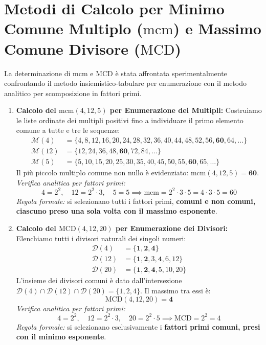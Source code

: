 \documentclass[11pt,a4paper,oneside]{report}
\begin{document}
\section{Metodi di Calcolo per Minimo Comune Multiplo (\texorpdfstring{$\mathrm{mcm}$}{mcm}) e Massimo Comune Divisore (\texorpdfstring{$\mathrm{MCD}$}{MCD})}
\begin{laboratorio}
La determinazione di $\mathrm{mcm}$ e $\mathrm{MCD}$ \`e stata affrontata sperimentalmente confrontando il metodo insiemistico-tabulare per enumerazione con il metodo analitico per scomposizione in fattori primi.
\begin{enumerate}[leftmargin=2em]
  \item \textbf{Calcolo del $\mathrm{mcm}(4, 12, 5)$ per Enumerazione dei Multipli:}
  Costruiamo le liste ordinate dei multipli positivi fino a individuare il primo elemento comune a tutte e tre le sequenze:
  \[
  \begin{aligned}
    \mathcal{M}(4)  &= \{4, 8, 12, 16, 20, 24, 28, 32, 36, 40, 44, 48, 52, 56, \mathbf{60}, 64, \dots\} \\
    \mathcal{M}(12) &= \{12, 24, 36, 48, \mathbf{60}, 72, 84, \dots\} \\
    \mathcal{M}(5)  &= \{5, 10, 15, 20, 25, 30, 35, 40, 45, 50, 55, \mathbf{60}, 65, \dots\}
  \end{aligned}
  \]
  Il pi\`u piccolo multiplo comune non nullo \`e evidenziato: $\mathrm{mcm}(4, 12, 5) = \mathbf{60}$.\\
  \textit{Verifica analitica per fattori primi:}
  \[
  4 = 2^2, \quad 12 = 2^2 \cdot 3, \quad 5 = 5 \implies \mathrm{mcm} = 2^2 \cdot 3 \cdot 5 = 4 \cdot 3 \cdot 5 = 60
  \]
  \textit{Regola formale:} si selezionano tutti i fattori primi, \textbf{comuni e non comuni, ciascuno preso una sola volta con il massimo esponente}.

  \item \textbf{Calcolo del $\mathrm{MCD}(4, 12, 20)$ per Enumerazione dei Divisori:}
  Elenchiamo tutti i divisori naturali dei singoli numeri:
  \[
  \begin{aligned}
    \mathcal{D}(4)  &= \{\mathbf{1}, \mathbf{2}, \mathbf{4}\} \\
    \mathcal{D}(12) &= \{\mathbf{1}, \mathbf{2}, 3, \mathbf{4}, 6, 12\} \\
    \mathcal{D}(20) &= \{\mathbf{1}, \mathbf{2}, \mathbf{4}, 5, 10, 20\}
  \end{aligned}
  \]
  L'insieme dei divisori comuni \`e dato dall'intersezione $\mathcal{D}(4) \cap \mathcal{D}(12) \cap \mathcal{D}(20) = \{1, 2, 4\}$. Il massimo tra essi \`e:
  \[
  \mathrm{MCD}(4, 12, 20) = \mathbf{4}
  \]
  \textit{Verifica analitica per fattori primi:}
  \[
  4 = 2^2, \quad 12 = 2^2 \cdot 3, \quad 20 = 2^2 \cdot 5 \implies \mathrm{MCD} = 2^2 = 4
  \]
  \textit{Regola formale:} si selezionano esclusivamente i \textbf{fattori primi comuni, presi con il minimo esponente}.
\end{enumerate}
\end{laboratorio}
\end{document}
